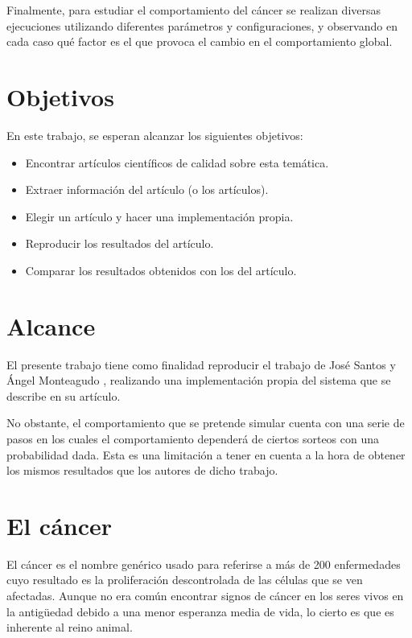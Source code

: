 Finalmente, para estudiar el comportamiento del cáncer se realizan diversas ejecuciones utilizando diferentes parámetros y configuraciones,
y observando en cada caso qué factor es el que provoca el cambio en el comportamiento global.

\section{Objetivos}

En este trabajo, se esperan alcanzar los siguientes objetivos:

\begin{itemize}
  \item Encontrar artículos científicos de calidad sobre esta temática.
  \item Extraer información del artículo (o los artículos).
  \item Elegir un artículo y hacer una implementación propia.
  \item Reproducir los resultados del artículo.
  \item Comparar los resultados obtenidos con los del artículo.
\end{itemize}

\section{Alcance}

El presente trabajo tiene como finalidad reproducir el trabajo de José Santos y Ángel Monteagudo \cite{jsantos-amonteagudo-1-2014}, realizando
una implementación propia del sistema que se describe en su artículo.

No obstante, el comportamiento que se pretende simular cuenta con una serie de pasos en los cuales el comportamiento dependerá
de ciertos sorteos con una probabilidad dada. Esta es una limitación a tener en cuenta a la hora de obtener los mismos resultados
que los autores de dicho trabajo.

\section{El cáncer}

El cáncer es el nombre genérico usado para referirse a más de 200 enfermedades cuyo resultado
es la proliferación descontrolada de las células que se ven afectadas. Aunque no era común
encontrar signos de cáncer en los seres vivos en la antigüedad debido a una menor esperanza
media de vida, lo cierto es que es inherente al reino animal.


